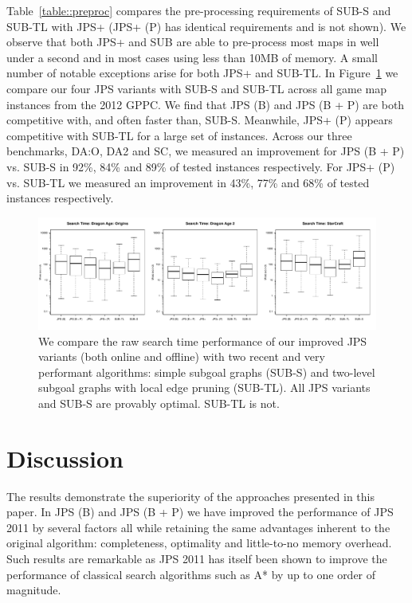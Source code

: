 Table~\ref{table::preproc} compares the pre-processing requirements of 
SUB-S and SUB-TL with JPS+ (JPS+ (P) has identical requirements and is not shown). 
We observe that both JPS+ and SUB are able to pre-process most maps in well under a second 
and in most cases using less than 10MB of memory. A small number of notable exceptions 
arise for both JPS+ and SUB-TL.
In Figure~\ref{fig::vs_sub} we compare our four JPS variants with SUB-S and SUB-TL across all
game map instances from the 2012 GPPC. We find that JPS (B) and JPS (B + P) are both
competitive with, and often faster than, SUB-S. Meanwhile, JPS+ (P) appears competitive 
with SUB-TL for a large set of instances.
Across our three benchmarks, DA:O, DA2 and SC, we measured an improvement for 
JPS (B + P) vs. SUB-S in 92\%, 84\% and 89\% of tested instances respectively.
For JPS+ (P) vs. SUB-TL we measured an improvement in 43\%, 77\% and 68\% of 
tested instances respectively.

\begin{figure}[tb] 
\begin{center}
		   \includegraphics[width=2.15\columnwidth, trim = 0mm 0mm 0mm 0mm]
			{diagrams/jps_vs_sub_boxplot.pdf}
       \end{center}
		\vspace{-1em}
	   \caption{\small We compare the raw search time performance of our improved JPS variants (both online
		   and offline) with two recent and very performant algorithms: simple subgoal graphs (SUB-S) 
		   and two-level subgoal graphs with local edge pruning (SUB-TL). All JPS variants and SUB-S 
		   are provably optimal. SUB-TL is not.}
\label{fig::vs_sub}
\end{figure}

\section{Discussion}
The results demonstrate the superiority of the approaches presented in this
paper. In JPS (B) and JPS (B + P) we have improved the performance of
JPS 2011 by several factors all while retaining
the same advantages inherent to the original algorithm: completeness, 
optimality and little-to-no memory overhead. Such results are remarkable as
JPS 2011 has itself been shown to improve the performance of classical
search algorithms such as A* by up to one order of magnitude.

